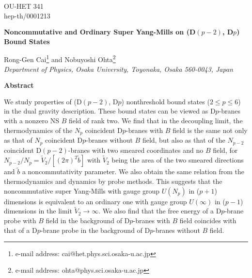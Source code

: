 \documentclass[a4paper,12pt]{article}
\begin{document}
\topmargin 0pt
\oddsidemargin 0mm

\renewcommand{\thefootnote}{\fnsymbol{footnote}}
\begin{titlepage}
\begin{flushright}
OU-HET 341 \\
hep-th/0001213
\end{flushright}

\vspace{5mm}
\begin{center}
{\Large \bf Noncommutative and Ordinary Super Yang-Mills on (D$(p-2)$, D$p$)
Bound States}
\vspace{10mm}

{\large
Rong-Gen Cai\footnote{e-mail address: cai@het.phys.sci.osaka-u.ac.jp} and
Nobuyoshi Ohta\footnote{e-mail address: ohta@phys.sci.osaka-u.ac.jp}} \\
\vspace{8mm}
{\em Department of Physics, Osaka University,
Toyonaka, Osaka 560-0043, Japan}

\end{center}
\vspace{5mm}
\centerline{{\bf{Abstract}}}
\vspace{5mm}

We study properties of (D$(p-2)$, D$p$) nonthreshold bound states
($2 \le p \le 6 $) in the dual gravity description. These bound
states can be viewed as D$p$-branes with a nonzero NS $B$ field of rank
two. We find that in the decoupling limit, the thermodynamics of the $N_p$
coincident D$p$-branes with $B$ field is the same not only as that of $N_p$
coincident D$p$-branes without $B$ field, but also as that of the $N_{p-2}$
coincident D$(p-2)$-branes with two smeared coordinates and no $B$ field,
for $N_{p-2}/N_p= \tilde{V}_2/[(2\pi)^2 \tilde{b}]$ with $\tilde{V}_2$ being
the area of the two smeared directions and $\tilde{b}$ a noncommutativity
parameter. We also obtain the same relation from the thermodynamics and
dynamics by probe methods. This suggests that the noncommutative super
Yang-Mills with gauge group $U(N_p)$ in ($p+1$) dimensions is equivalent to
an ordinary one with gauge group $U(\infty)$ in ($p-1$) dimensions in the
limit $\tilde{V}_2 \to \infty$. We also find that the free energy
of a D$p$-brane probe with $B$ field in the background of D$p$-branes with
$B$ field coincides with that of a D$p$-brane probe in the background of
D$p$-branes without $B$ field.

\end{titlepage}
\end{document}
